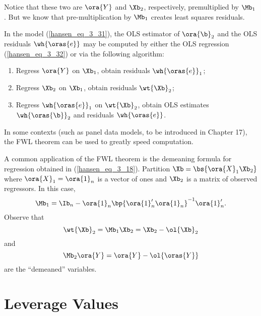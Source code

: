  Notice that these two are $\ora{Y}$ and $\Xb_2$, respectively, premultiplied by $\Mb_1$. But we know that pre-multiplication by $\Mb_1$ creates least squares residuals. 

\begin{theorem}
    
    In the model (\ref{hansen_eq_3_31}), the OLS estimator of $\ora{\b}_2$ and the OLS residuals $\wh{\oras{e}}$ may be computed by either the OLS regression (\ref{hansen_eq_3_32}) or via the following algorithm:
    \begin{enumerate}[topsep=10pt, leftmargin=20pt, itemsep=0pt, label=(\arabic*)]
        \setlength{\parskip}{10pt} 
        \item Regress $\ora{Y}$ on $\Xb_1$, obtain residuals $\wh{\oras{e}}_1$;
        \item Regress $\Xb_2$ on $\Xb_1$, obtain residuals $\wt{\Xb}_2$;
        \item Regress $\wh{\oras{e}}_1$ on $\wt{\Xb}_2$, obtain OLS estimates $\wh{\oras{\b}}_2$ and residuals $\wh{\oras{e}}$.
    \end{enumerate}
\end{theorem}

In some contexts (such as panel data models, to be introduced in Chapter 17), the FWL theorem can be used to greatly speed computation.

A common application of the FWL theorem is the demeaning formula for regression obtained in (\ref{hansen_eq_3_18}). Partition $\Xb = \bs{\ora{X}_1 \Xb_2}$ where $\ora{X}_1 = \ora{1}_n$ is a vector of ones and $\Xb_2$ is a matrix of observed regressors. In this case, 
$$\Mb_1 = \Ib_n - \ora{1}_n \bp{\ora{1}_n^\prime \ora{1}_n}^{-1} \ora{1}_n^\prime.$$
Observe that 
$$\wt{\Xb}_2 = \Mb_1 \Xb_2 = \Xb_2 - \ol{\Xb}_2$$
and 
$$\Mb_2 \ora{Y} = \ora{Y} - \ol{\oras{Y}}$$
are the ``demeaned'' variables.

\section{Leverage Values}

